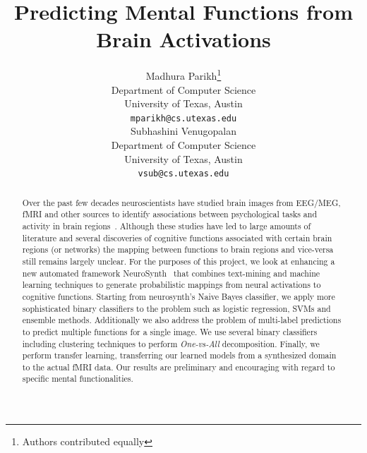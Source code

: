 \documentclass{article} %
\title{Predicting Mental Functions from Brain Activations}
\author{
Madhura Parikh\thanks{Authors contributed equally}\\
Department of Computer Science\\
University of Texas, Austin\\
\texttt{mparikh@cs.utexas.edu} \\
\And
Subhashini Venugopalan\footnotemark[1] \\
Department of Computer Science\\
University of Texas, Austin\\
\texttt{vsub@cs.utexas.edu} \\
}
\begin{document}
\maketitle

\begin{abstract}
Over the past few decades neuroscientists have studied brain images from EEG/MEG, fMRI and other sources to identify associations between psychological tasks and activity in brain regions~\cite{PMSKBY12}.
Although these studies have led to large amounts of literature and several discoveries of cognitive functions associated with certain brain regions (or networks) the mapping between functions to brain regions and vice-versa still remains largely unclear. For the purposes of this project, we look at enhancing a new automated framework NeuroSynth~\cite{yarkoni2011large}  that combines text-mining and machine learning techniques to generate probabilistic mappings from neural activations to cognitive functions. Starting from neurosynth's Naive Bayes classifier, we apply more sophisticated binary classifiers to the problem such as logistic regression, SVMs and ensemble methods. Additionally we also address the problem of multi-label predictions to predict multiple functions for a single image. We use several binary classifiers including clustering techniques to perform \textit{One-vs-All} decomposition. Finally, we perform transfer learning, transferring our learned models from a synthesized domain to the actual fMRI data. Our results are preliminary and encouraging with regard to specific mental functionalities.
\end{abstract}
\end{document}
